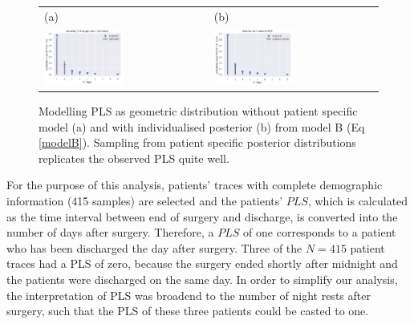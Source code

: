 \begin{figure}
  \centering
  \begin{tabular}{ll}
    (a) & (b) \\
    \includegraphics[width=0.5\textwidth]{images/DS19eH1_G0__empirical_geometric.pdf}
    &
    \includegraphics[width=0.5\textwidth]{images/DS19fk1_c0__sampled_posterior.pdf}\\
  \end{tabular}
    \caption{Modelling PLS as geometric distribution without patient
      specific model (a) and with individualised posterior (b) from
      model B (Eq \eqref{modelB}). Sampling from patient specific
      posterior distributions replicates the observed PLS quite well.
      }
    \label{fig:Geom}
\end{figure}

For the purpose of this analysis, patients' traces with complete
demographic information (415 samples) are selected and
the patients' $PLS$, which is
calculated as the time interval between end of surgery and discharge, is
converted into the number of days after surgery. Therefore, a $PLS$ of
one corresponds to a patient who has been discharged the day after
surgery. Three of the $N=415$  %
patient traces had a PLS of zero, because the surgery ended shortly after midnight and the patients were discharged on the same day. In order to simplify our analysis, the interpretation of PLS was broadend to the number of night rests after surgery, such that the PLS of these three patients could be casted to one.


